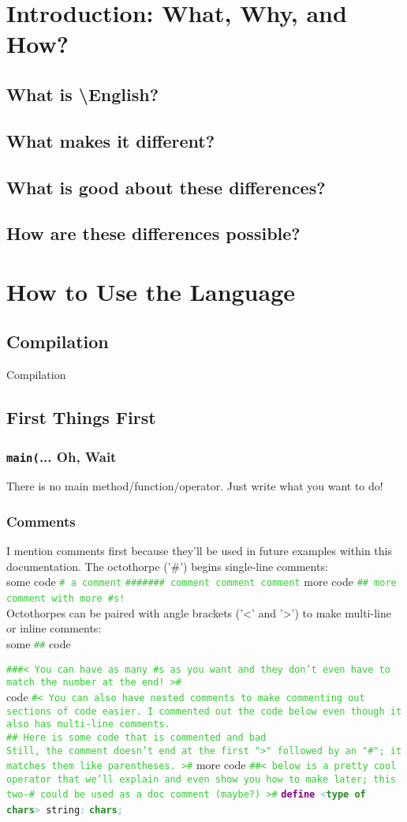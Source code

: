 \documentclass{article}
\newcommand{\name}{\textbackslash{}English}				%
\newcommand{\secl}[1]{\section{#1}\label{sec:#1}}
\newcommand{\ssecl}[1]{\subsection{#1}\label{ssec:#1}}
\newcommand{\sssecl}[1]{\subsubsection{#1}\label{sssec:#1}}
\newcommand{\commentline}[1]{\texttt{\textcolor{LimeGreen}{#1}}}
\newcommand{\type}[1]{\texttt{\textcolor{ForestGreen}{\textbf{#1}}}}
\newcommand{\keyop}[1]{\texttt{\textcolor{Purple}{\textbf{#1}}}}
\newcommand{\defpunct}[1]{\texttt{\textcolor{SkyBlue}{\textbf{#1}}}}
\newcommand{\define}[2]{\texttt{\keyop{define} \defpunct{<}#1\defpunct{>} #2\defpunct{:}}}
\newenvironment{code}[0]
{\ttfamily{}				%
\setlength\parindent{0cm}	%
~\\}
{\setlength\parindent{1cm}
~\\}
\begin{document}
\setlength\parindent{1cm}								%

\tableofcontents
\newpage

\obeylines												%

\secl{Introduction: What, Why, and How?}
\ssecl{What is \name{}?}

\ssecl{What makes it different?}

\ssecl{What is good about these differences?}

\ssecl{How are these differences possible?}

\secl{How to Use the Language}
\ssecl{Compilation}{Compilation}

\ssecl{First Things First}
\sssecl{\texttt{main(}... Oh, Wait}
\indent There is no main method/function/operator. Just write what you want to do!
\sssecl{Comments}
\indent I mention comments first because they'll be used in future examples within this documentation.
\indent The octothorpe ('\#') begins single-line comments:
\begin{code}
some code		\commentline{\# a comment}
\commentline{\#\#\#\#\#\#\# comment comment comment}
more code		\commentline{\#\# more comment with more \#s!}
\end{code}
\indent Octothorpes can be paired with angle brackets ('<' and '>') to make multi-line or inline comments:
\begin{code}
some \commentline{\#< awesome >\#} code

\commentline{\#\#\#< You can have as many \#s as you want and they don't
even have to match the number at the end! >\#\\}
code
\commentline{\#< You can also have nested comments to make commenting out sections of code easier. 
I commented out the code below even though it also has multi-line comments.\\

\#< This is a comment >\# Here is some code that is commented and bad\\

Still, the comment doesn't end at the first ">" followed by an "\#"; it matches them like parentheses. 
>\#}
more code
\commentline{\#\#< below is a pretty cool operator that we'll explain and even show you how to make later; this two-\# could be used as a doc comment (maybe?) >\#}
\define{\type{type of chars}}{string}
\qquad\type{chars}\defpunct{;}
\end{code}
\end{document}
